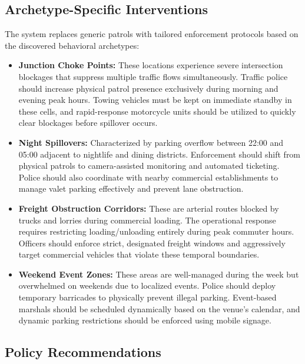 \documentclass[12pt,a4paper]{article}
\begin{document}
\subsection{Archetype-Specific Interventions}
The system replaces generic patrols with tailored enforcement protocols based on the discovered behavioral archetypes:

\begin{itemize}[leftmargin=1.5em]
  \item \textbf{Junction Choke Points:} 
  These locations experience severe intersection blockages that suppress multiple traffic flows simultaneously. Traffic police should increase physical patrol presence exclusively during morning and evening peak hours. Towing vehicles must be kept on immediate standby in these cells, and rapid-response motorcycle units should be utilized to quickly clear blockages before spillover occurs.
  
  \item \textbf{Night Spillovers:} 
  Characterized by parking overflow between 22:00 and 05:00 adjacent to nightlife and dining districts. Enforcement should shift from physical patrols to camera-assisted monitoring and automated ticketing. Police should also coordinate with nearby commercial establishments to manage valet parking effectively and prevent lane obstruction.
  
  \item \textbf{Freight Obstruction Corridors:} 
  These are arterial routes blocked by trucks and lorries during commercial loading. The operational response requires restricting loading/unloading entirely during peak commuter hours. Officers should enforce strict, designated freight windows and aggressively target commercial vehicles that violate these temporal boundaries.
  
  \item \textbf{Weekend Event Zones:} 
  These areas are well-managed during the week but overwhelmed on weekends due to localized events. Police should deploy temporary barricades to physically prevent illegal parking. Event-based marshals should be scheduled dynamically based on the venue's calendar, and dynamic parking restrictions should be enforced using mobile signage.
\end{itemize}

\subsection{Policy Recommendations}
\end{document}
